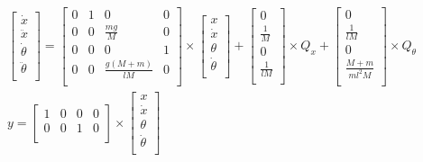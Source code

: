 \begin{equation}
    \begin{array}{cc}
        \begin{bmatrix}
        \dot{x} \\
        \ddot{x} \\
        \dot{\theta} \\
        \ddot{\theta} \\
    \end{bmatrix} = \begin{bmatrix}
        0 & 1 & 0 & 0 \\
        0 & 0 & \frac{mg}{M} & 0 \\
        0 & 0 & 0 & 1 \\
        0 & 0 & \frac{g(M + m)}{lM} & 0 \\
    \end{bmatrix} \times \begin{bmatrix}
        x \\
        \dot{x} \\
        \theta \\
        \dot{\theta} \\
    \end{bmatrix} + \begin{bmatrix}
        0 \\
        \frac{1}{M} \\
        0 \\
        \frac{1}{lM} \\
    \end{bmatrix} \times Q_x + \begin{bmatrix}
        0 \\
        \frac{1}{lM} \\
        0 \\
        \frac{M + m}{ml^2M} \\ 
    \end{bmatrix} \times Q_{\theta}  \\[4em]
    y = \begin{bmatrix}
        1 & 0 & 0 & 0 \\
        0 & 0 & 1 & 0 \\ 
    \end{bmatrix} \times \begin{bmatrix}
        x \\
        \dot{x} \\
        \theta \\
        \dot{\theta} \\
    \end{bmatrix}
    \end{array}
\end{equation}
